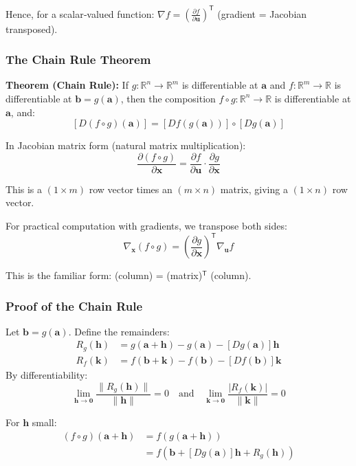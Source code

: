 \begin{notechapter}
Hence, for a scalar‑valued function: $\nabla f = \left(\frac{\partial
f}{\partial \mathbf{u}}\right)^\mathsf{T}$ (gradient = Jacobian transposed).

\subsubsection{The Chain Rule Theorem}

\textbf{Theorem (Chain Rule):} If $g: \mathbb{R}^n \to \mathbb{R}^m$ is
differentiable at $\mathbf{a}$ and $f: \mathbb{R}^m \to \mathbb{R}$ is
differentiable at $\mathbf{b} = g(\mathbf{a})$, then the composition $f \circ g:
\mathbb{R}^n \to \mathbb{R}$ is differentiable at $\mathbf{a}$, and:
\[
[D(f \circ g)(\mathbf{a})] = [Df(g(\mathbf{a}))] \circ [Dg(\mathbf{a})]
\]

In Jacobian matrix form (natural matrix multiplication):
\[
\frac{\partial (f \circ g)}{\partial \mathbf{x}} = \frac{\partial f}{\partial \mathbf{u}} \cdot \frac{\partial g}{\partial \mathbf{x}}
\]

This is a $(1 \times m)$ row vector times an $(m \times n)$ matrix, giving a $(1
\times n)$ row vector.

For practical computation with gradients, we transpose both sides:
\[
\nabla_{\mathbf{x}} (f \circ g) = \left(\frac{\partial g}{\partial \mathbf{x}}\right)^\mathsf{T} \nabla_{\mathbf{u}} f
\]

This is the familiar form: (column) = (matrix)$^\mathsf{T}$ (column).

\subsubsection{Proof of the Chain Rule}

Let $\mathbf{b} = g(\mathbf{a})$. Define the remainders:
\begin{align*}
    R_g(\mathbf{h}) &= g(\mathbf{a} + \mathbf{h}) - g(\mathbf{a}) - [Dg(\mathbf{a})]\mathbf{h} \\
R_f(\mathbf{k}) &= f(\mathbf{b} + \mathbf{k}) - f(\mathbf{b}) -
[Df(\mathbf{b})]\mathbf{k}
\end{align*}
By differentiability:
\[
\lim_{\mathbf{h} \to \mathbf{0}} \frac{\|R_g(\mathbf{h})\|}{\|\mathbf{h}\|} = 0 \quad \text{and} \quad \lim_{\mathbf{k} \to \mathbf{0}} \frac{|R_f(\mathbf{k})|}{\|\mathbf{k}\|} = 0
\]

For $\mathbf{h}$ small:
\begin{align*}
    (f \circ g)(\mathbf{a} + \mathbf{h}) &= f(g(\mathbf{a} + \mathbf{h})) \\
    &= f(\mathbf{b} + [Dg(\mathbf{a})]\mathbf{h} + R_g(\mathbf{h}))
\end{align*}


\end{notechapter}
